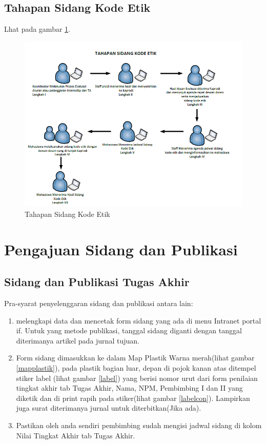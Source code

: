\section{Tahapan Sidang Kode Etik}
Lhat pada gambar \ref{figure:P5}.
\begin{figure}[ht]
	\centerline{\includegraphics[width=1\textwidth]{figures/kode.png}}
	\caption{Tahapan Sidang Kode Etik}
	\label{figure:P5}
	\end{figure}
	
	
\chapter{Pengajuan Sidang dan Publikasi}

\section{Sidang dan Publikasi Tugas Akhir}
Pra-syarat penyelenggaran sidang dan publikasi antara lain:
\begin{enumerate}
	\item melengkapi data dan mencetak form sidang yang ada di menu Intranet portal if. Untuk yang metode publikasi, tanggal sidang diganti dengan tanggal diterimanya artikel pada jurnal tujuan. 
	\item Form sidang dimasukkan ke dalam Map Plastik Warna merah(lihat gambar \ref{mapplastik}), pada plastik bagian luar, depan di pojok kanan atas ditempel stiker label (lihat gambar \ref{label}) yang berisi nomor urut dari form penilaian tingkat akhir tab Tugas Akhir, Nama, NPM, Pembimbing I dan II yang diketik dan di print rapih pada stiker(lihat gambar \ref{labelcon}). Lampirkan juga surat diterimanya jurnal untuk diterbitkan(Jika ada).
	\item Pastikan oleh anda sendiri pembimbing sudah mengisi jadwal sidang di kolom Nilai Tingkat Akhir tab Tugas Akhir.
\end{enumerate}

